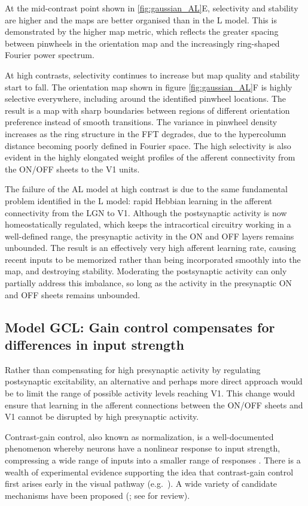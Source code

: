 \documentclass{article}
\begin{document}
At the mid-contrast point shown in \ref{fig:gaussian_AL}E,
selectivity and stability are higher and the maps are better organised
than in the L model. This is demonstrated by the higher map metric,
which reflects the greater spacing between pinwheels in the orientation map and the
increasingly ring-shaped Fourier power spectrum.

At high contrasts, selectivity continues to increase but map quality
and stability start to fall. The orientation map shown in figure
\ref{fig:gaussian_AL}F is highly selective everywhere, including
around the identified pinwheel locations. The result is a map with
sharp boundaries between regions of different orientation preference
instead of smooth transitions.  The variance in
pinwheel density increases as the ring structure in the FFT degrades,
due to the hypercolumn distance becoming poorly defined in Fourier
space. The high selectivity is also evident in the highly elongated
weight profiles of the afferent connectivity from the ON/OFF sheets to
the V1 units.

The failure of the AL model at high contrast is due to the same
fundamental problem identified in the L model: rapid Hebbian learning
in the afferent connectivity from the LGN to V1. Although the
postsynaptic activity is now homeostatically regulated, which keeps
the intracortical circuitry working in a well-defined range, the
presynaptic activity in the ON and OFF layers remains unbounded.  The
result is an effectively very high afferent learning rate, causing
recent inputs to be memorized rather than being incorporated smoothly
into the map, and destroying stability.  Moderating the postsynaptic
activity can only partially address this imbalance, so long as the
activity in the presynaptic ON and OFF sheets remains unbounded.

\subsection*{Model GCL: Gain control compensates for differences in input strength}

Rather than compensating for high presynaptic activity by regulating
postsynaptic excitability, an alternative and perhaps more direct
approach would be to limit the range of possible activity levels
reaching V1. This change would ensure that learning in the afferent
connections between the ON/OFF sheets and V1 cannot be disrupted by
high presynaptic activity.

Contrast-gain control, also known as normalization, is a
well-documented phenomenon whereby neurons have a nonlinear response
to input strength, compressing a wide range of inputs into a smaller
range of responses \citep{bonin:jn05}.  There is a wealth of
experimental evidence supporting the idea that contrast-gain control
first arises early in the visual pathway
(e.g.\ \citealp{Shapley1978,Baccus2002,Derrington1984,Sclar1987,Alitto2004,Truchard2000}).
A wide variety of candidate mechanisms have been proposed
(\citealp{Carandini2002,Geisler1997,Finn2007,Anderson2000}; see
\citealp{Heegerreview} for review).
\end{document}
